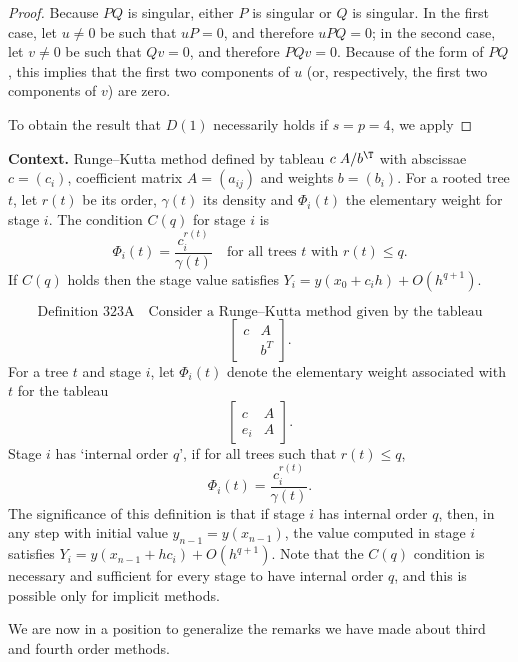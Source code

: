 \begin{proof}

Because $PQ$ is singular, either $P$ is singular or $Q$ is singular. In the first case, let $u \neq 0$ be such that $uP = 0$, and therefore $uPQ = 0$; in the second case, let $v \neq 0$ be such that $Qv = 0$, and therefore $PQv = 0$. Because of the form of $PQ$, this implies that the first two components of $u$ (or, respectively, the first two components of $v$) are zero.

To obtain the result that $D(1)$ necessarily holds if $s = p = 4$, we apply
\end{proof}

\noindent\textbf{Context.}
Runge--Kutta method defined by tableau $c\; A / b^{\T}$ with abscissae $c=(c_i)$, coefficient matrix $A=(a_{ij})$ and weights $b=(b_i)$. For a rooted tree $t$, let $r(t)$ be its order, $\gamma(t)$ its density and $\Phi_i(t)$ the elementary weight for stage $i$. The condition $C(q)$ for stage $i$ is
\[
\Phi_i(t)=\frac{c_i^{r(t)}}{\gamma(t)}\quad\text{for all trees }t\text{ with }r(t)\le q.
\]
If $C(q)$ holds then the stage value satisfies $Y_i=y(x_0+c_i h)+O(h^{q+1})$.

  \label{def:323A}
\[
\text{Definition 323A}\quad
\text{Consider a Runge–Kutta method given by the tableau}
\]
\[
\left[\begin{array}{cc}
c & A \\
  & b^T
\end{array}\right].
\]
For a tree \(t\) and stage \(i\), let \(\Phi_i(t)\) denote the elementary weight associated with \(t\) for the tableau
\[
\left[\begin{array}{cc}
c & A \\
e_i & A
\end{array}\right].
\]
Stage \(i\) has ‘internal order \(q\)’, if for all trees such that \(r(t) \le q\),
\[
\Phi_i(t) = \frac{c_i^{r(t)}}{\gamma(t)}.
\]
The significance of this definition is that if stage \(i\) has internal order \(q\), then, in any step with initial value \(y_{n-1} = y(x_{n-1})\), the value computed in stage \(i\) satisfies \(Y_i = y(x_{n-1} + hc_i) + O(h^{q+1})\). Note that the \(C(q)\) condition is necessary and sufficient for every stage to have internal order \(q\), and this is possible only for implicit methods.

We are now in a position to generalize the remarks we have made about third and fourth order methods.

